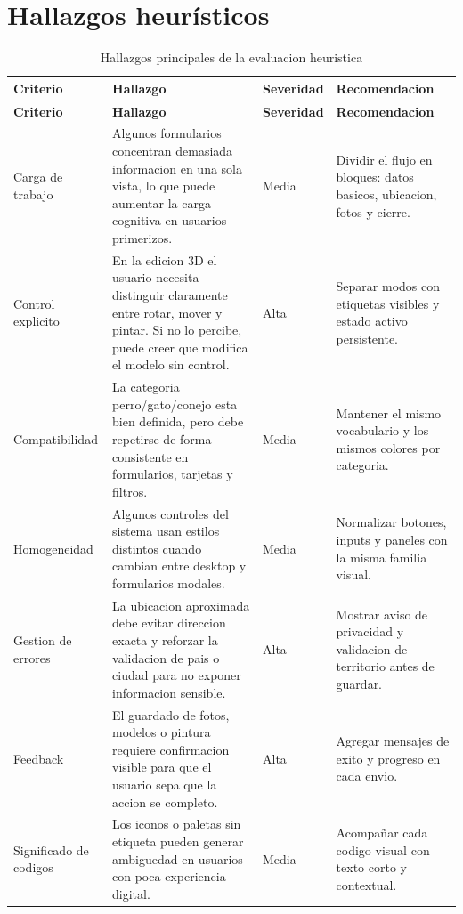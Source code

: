 \documentclass[12pt,a4paper]{article}
\begin{document}
\section{Hallazgos heur\'isticos}
\small
\setlength{\tabcolsep}{4pt}
\begin{longtable}{@{}p{2.2cm}p{4.1cm}p{1.4cm}p{6.0cm}@{}}
\caption{Hallazgos principales de la evaluacion heuristica}\\
\toprule
\textbf{Criterio} & \textbf{Hallazgo} & \textbf{Severidad} & \textbf{Recomendacion} \\
\midrule
\endfirsthead
\toprule
\textbf{Criterio} & \textbf{Hallazgo} & \textbf{Severidad} & \textbf{Recomendacion} \\
\midrule
\endhead
Carga de trabajo & Algunos formularios concentran demasiada informacion en una sola vista, lo que puede aumentar la carga cognitiva en usuarios primerizos. & Media & Dividir el flujo en bloques: datos basicos, ubicacion, fotos y cierre. \\
Control explicito & En la edicion 3D el usuario necesita distinguir claramente entre rotar, mover y pintar. Si no lo percibe, puede creer que modifica el modelo sin control. & Alta & Separar modos con etiquetas visibles y estado activo persistente. \\
Compatibilidad & La categoria perro/gato/conejo esta bien definida, pero debe repetirse de forma consistente en formularios, tarjetas y filtros. & Media & Mantener el mismo vocabulario y los mismos colores por categoria. \\
Homogeneidad & Algunos controles del sistema usan estilos distintos cuando cambian entre desktop y formularios modales. & Media & Normalizar botones, inputs y paneles con la misma familia visual. \\
Gestion de errores & La ubicacion aproximada debe evitar direccion exacta y reforzar la validacion de pais o ciudad para no exponer informacion sensible. & Alta & Mostrar aviso de privacidad y validacion de territorio antes de guardar. \\
Feedback & El guardado de fotos, modelos o pintura requiere confirmacion visible para que el usuario sepa que la accion se completo. & Alta & Agregar mensajes de exito y progreso en cada envio. \\
Significado de codigos & Los iconos o paletas sin etiqueta pueden generar ambiguedad en usuarios con poca experiencia digital. & Media & Acompa\~nar cada codigo visual con texto corto y contextual. \\
\bottomrule
\end{longtable}
\normalsize
\end{document}

